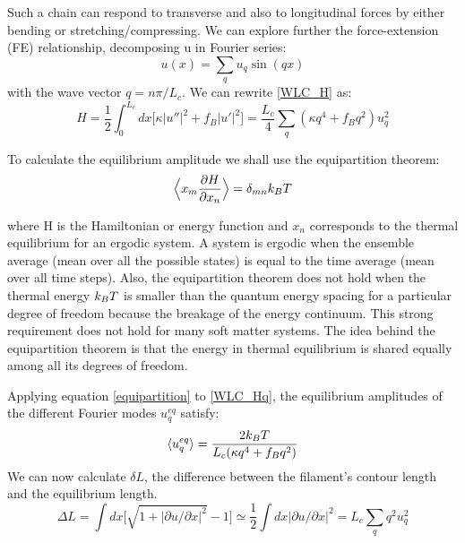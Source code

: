 Such a chain can respond to transverse and also to longitudinal forces by either
bending or stretching/compressing.  We can explore further the force-extension
(FE) relationship, decomposing u in Fourier series:
\begin{equation}\label{WLC_ufourier}
u(x)=\sum_q u_q \sin(qx)
\end{equation}
with the wave vector $q=n\pi/L_c$. We can rewrite \ref{WLC_H} as:
\begin{equation}\label{WLC_Hq}
H=\frac{1}{2}\int_0^{L_c} dx\Big[\kappa|u''|^2 + f_B|u'|^2\Big] =
\frac{L_c}{4}\sum_q (\kappa q^4 + f_Bq^2)u_q^2
\end{equation}

To calculate the equilibrium amplitude we shall use the equipartition theorem:
\begin{equation}\label{equipartition}
\Big\langle x_m\frac{\partial H}{\partial x_n} \Big\rangle= \delta_{mn}k_B{}T
\end{equation}

where H is the Hamiltonian or energy function and $x_n$ corresponds to the
thermal equilibrium for an ergodic system. A system is ergodic when
the ensemble average (mean over all the possible states) is equal to the time average (mean over all time
steps). Also, the equipartition theorem does not hold when the
thermal energy $k_B{}T$ is smaller than the quantum energy spacing for a
particular degree of freedom because the breakage of the energy continuum. This
strong requirement does not hold for many soft matter systems. The idea behind
the equipartition theorem is that the energy in thermal equilibrium is shared
equally among all its degrees of freedom.

Applying equation \ref{equipartition} to \ref{WLC_Hq}, the equilibrium
amplitudes of the different Fourier modes $u_q^{eq} $ satisfy:
\begin{equation}\label{equipartition_uq}
\langle u_q^{eq}\rangle=\frac{2k_B{}T}{L_c(\kappa{}q^4+f_Bq^2)}
\end{equation}
We can now calculate $\delta L$, the difference between the filament's contour
length and the equilibrium length.
\begin{equation}\label{deltaL}
\Delta L= \int dx \Big[ \sqrt{1+|\partial u/\partial x|^2} -1\Big]\simeq
\frac{1}{2} \int dx |\partial u/\partial x|^2 = L_c \sum_q q^2 u_q^2
\end{equation}

